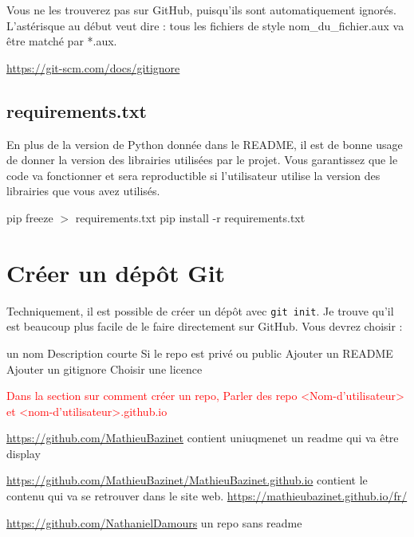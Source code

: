 \documentclass{book}
\begin{document}
Vous ne les trouverez pas sur GitHub, puisqu'ils sont automatiquement ignorés. L'astérisque au début veut dire : tous les fichiers de style nom\_du\_fichier.aux va être matché par *.aux. 

\url{https://git-scm.com/docs/gitignore}


\subsection{requirements.txt}
En plus de la version de Python donnée dans le README, il est de bonne usage de donner la version des librairies utilisées par le projet. Vous garantissez que le code va fonctionner et sera reproductible si l'utilisateur utilise la version des librairies que vous avez utilisés. 

pip freeze $>$ requirements.txt
pip install -r requirements.txt


\section{Créer un dépôt Git}\label{sec:creer_depot}

Techniquement, il est possible de créer un dépôt avec \texttt{git init}. Je trouve qu'il est beaucoup plus facile de le faire directement sur GitHub. Vous devrez choisir : 

un nom
Description courte
Si le repo est privé ou public
Ajouter un README
Ajouter un gitignore
Choisir une licence

\textcolor{red}{Dans la section sur comment créer un repo, Parler des repo <Nom-d'utilisateur> et <nom-d'utilisateur>.github.io }

\url{https://github.com/MathieuBazinet}
contient uniuqmenet un readme qui va être display

\url{https://github.com/MathieuBazinet/MathieuBazinet.github.io}
contient le contenu qui va se retrouver dans le site web.
\url{https://mathieubazinet.github.io/fr/}

\url{https://github.com/NathanielDamours} un repo sans readme
\end{document}
